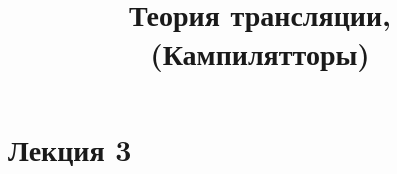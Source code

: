 \documentclass{article}
\begin{document}
\title{Теория трансляции, \\(Кампилятторы)}
\maketitle
\newpage
    \section{Лекция 3}
\end{document}
